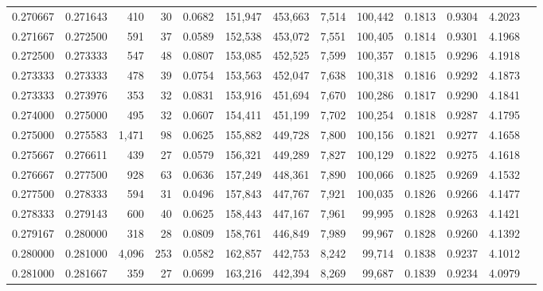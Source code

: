 \begin{tabular}{rrrrrrrrrrrrr}
0.270667 & 0.271643 &   410 &  30 &                                     0.0682 & 151,947 & 453,663 &   7,514 & 100,442 & 0.1813 & 0.9304 & 4.2023 \\
0.271667 & 0.272500 &   591 &  37 &                                     0.0589 & 152,538 & 453,072 &   7,551 & 100,405 & 0.1814 & 0.9301 & 4.1968 \\
0.272500 & 0.273333 &   547 &  48 &                                     0.0807 & 153,085 & 452,525 &   7,599 & 100,357 & 0.1815 & 0.9296 & 4.1918 \\
0.273333 & 0.273333 &   478 &  39 &                                     0.0754 & 153,563 & 452,047 &   7,638 & 100,318 & 0.1816 & 0.9292 & 4.1873 \\
0.273333 & 0.273976 &   353 &  32 &                                     0.0831 & 153,916 & 451,694 &   7,670 & 100,286 & 0.1817 & 0.9290 & 4.1841 \\
0.274000 & 0.275000 &   495 &  32 &                                     0.0607 & 154,411 & 451,199 &   7,702 & 100,254 & 0.1818 & 0.9287 & 4.1795 \\
0.275000 & 0.275583 & 1,471 &  98 &                                     0.0625 & 155,882 & 449,728 &   7,800 & 100,156 & 0.1821 & 0.9277 & 4.1658 \\
0.275667 & 0.276611 &   439 &  27 &                                     0.0579 & 156,321 & 449,289 &   7,827 & 100,129 & 0.1822 & 0.9275 & 4.1618 \\
0.276667 & 0.277500 &   928 &  63 &                                     0.0636 & 157,249 & 448,361 &   7,890 & 100,066 & 0.1825 & 0.9269 & 4.1532 \\
0.277500 & 0.278333 &   594 &  31 &                                     0.0496 & 157,843 & 447,767 &   7,921 & 100,035 & 0.1826 & 0.9266 & 4.1477 \\
0.278333 & 0.279143 &   600 &  40 &                                     0.0625 & 158,443 & 447,167 &   7,961 &  99,995 & 0.1828 & 0.9263 & 4.1421 \\
0.279167 & 0.280000 &   318 &  28 &                                     0.0809 & 158,761 & 446,849 &   7,989 &  99,967 & 0.1828 & 0.9260 & 4.1392 \\
0.280000 & 0.281000 & 4,096 & 253 &                                     0.0582 & 162,857 & 442,753 &   8,242 &  99,714 & 0.1838 & 0.9237 & 4.1012 \\
0.281000 & 0.281667 &   359 &  27 &                                     0.0699 & 163,216 & 442,394 &   8,269 &  99,687 & 0.1839 & 0.9234 & 4.0979 \\

\end{tabular}
